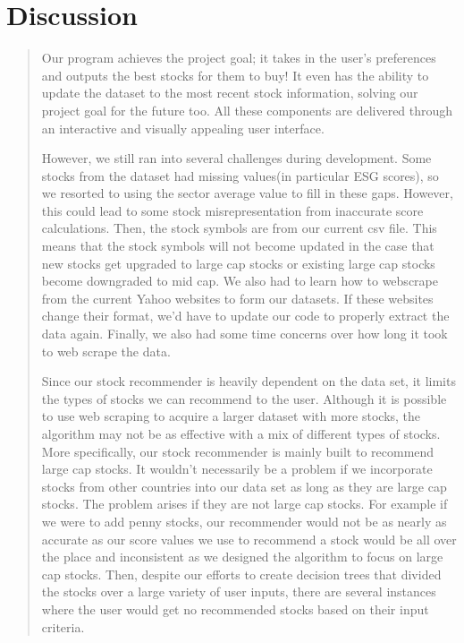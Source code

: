 \documentclass[fontsize=12pt]{article}
\begin{document}
\section*{Discussion}
\begin{quote}
\noindent
Our program achieves the project goal; it takes in the user’s preferences and outputs the best stocks for them to buy! It even has the ability to update the dataset to the most recent stock information, solving our project goal for the future too. All these components are delivered through an interactive and visually appealing user interface.
	
However, we still ran into several challenges during development. Some stocks from the dataset had missing values(in particular ESG scores), so we resorted to using the sector average value to fill in these gaps. However, this could lead to some stock misrepresentation from inaccurate score calculations. Then, the stock symbols are from our current csv file. This means that the stock symbols will not become updated in the case that new stocks get upgraded to large cap stocks or existing large cap stocks become downgraded to mid cap. We also had to learn how to webscrape from the current Yahoo websites to form our datasets. If these websites change their format, we’d have to update our code to properly extract the data again. Finally, we also had some time concerns over how long it took to web scrape the data.

Since our stock recommender is heavily dependent on the data set, it limits the types of stocks we can recommend to the user. Although it is possible to use web scraping to acquire a larger dataset with more stocks, the algorithm may not be as effective with a mix of different types of stocks. More specifically, our stock recommender is mainly built to recommend large cap stocks. It wouldn't necessarily be a problem if we incorporate stocks from other countries into our data set as long as they are large cap stocks. The problem arises if they are not large cap stocks. For example if we were to add penny stocks, our recommender would not be as nearly as accurate as our score values we use to recommend a stock would be all over the place and inconsistent as we designed the algorithm to focus on large cap stocks. Then, despite our efforts to create decision trees that divided the stocks over a large variety of user inputs, there are several instances where the user would get no recommended stocks based on their input criteria. 


\end{quote}
\end{document}

